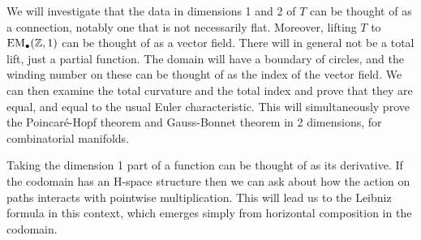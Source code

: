We will investigate that the data in dimensions 1 and 2 of \( T \) can be thought of as a connection, notably one that is not necessarily flat. Moreover, lifting \( T \) to \( \mathrm{EM_{\bullet}}(\mathbb{Z},1) \) can be thought of as a vector field. There will in general not be a total lift, just a partial function. The domain will have a boundary of circles, and the winding number on these can be thought of as the index of the vector field. We can then examine the total curvature and the total index and prove that they are equal, and equal to the usual Euler characteristic. This will simultaneously prove the Poincaré-Hopf theorem and Gauss-Bonnet theorem in 2 dimensions, for combinatorial manifolds.

Taking the dimension 1 part of a function can be thought of as its derivative. If the codomain has an H-space structure then we can ask about how the action on paths interacts with pointwise multiplication. This will lead us to the Leibniz formula in this context, which emerges simply from horizontal composition in the codomain.



